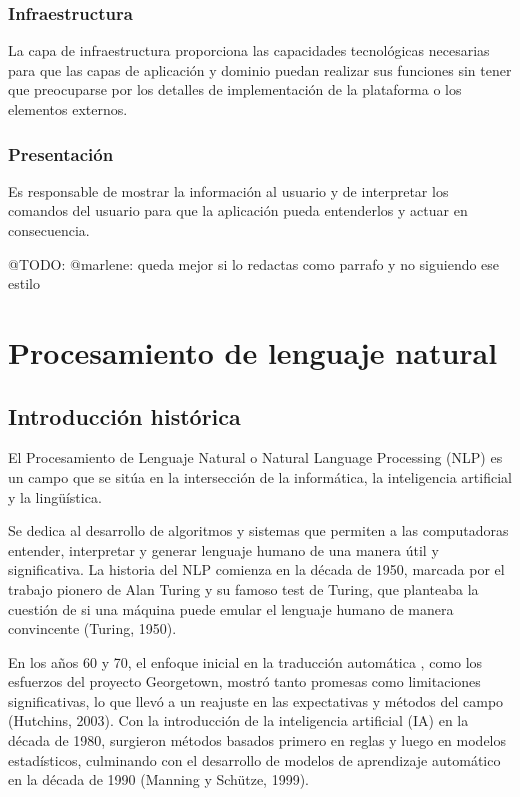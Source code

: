 \subsubsection*{Infraestructura}
La capa de infraestructura proporciona las capacidades tecnológicas necesarias para que las capas de
aplicación y dominio puedan realizar sus funciones sin tener que
preocuparse por los detalles de implementación de la plataforma o los elementos externos.

\subsubsection*{Presentación}
Es responsable de mostrar la información al usuario y de interpretar los
comandos del usuario para que la aplicación pueda entenderlos y actuar en consecuencia.

\colorbox{color_highlight}{@TODO: @marlene: queda mejor si lo redactas como parrafo y no siguiendo ese estilo}


\section{Procesamiento de lenguaje natural}

\subsection{Introducción histórica}
El Procesamiento de Lenguaje Natural o Natural Language Processing (NLP) es un campo que se sitúa en la
intersección de la informática, la inteligencia artificial y la lingüística.

Se dedica al desarrollo de algoritmos y sistemas que permiten a las computadoras entender, interpretar y generar
lenguaje humano de una manera útil y significativa.
La historia del NLP comienza en la década de 1950, marcada por el trabajo pionero de Alan Turing y su famoso
test de Turing, que planteaba la cuestión de si una máquina puede emular el lenguaje humano de manera convincente
(Turing, 1950).

En los años 60 y 70, el enfoque inicial en la traducción automática
, como los esfuerzos del proyecto Georgetown, mostró tanto promesas como limitaciones significativas, lo que llevó a un
reajuste en las expectativas y métodos del campo (Hutchins, 2003).
Con la introducción de la inteligencia artificial (IA) en la década de 1980, surgieron métodos basados primero en reglas
y luego en modelos
estadísticos, culminando con el desarrollo de modelos de aprendizaje automático en la década de 1990 (Manning y Schütze,
1999).

